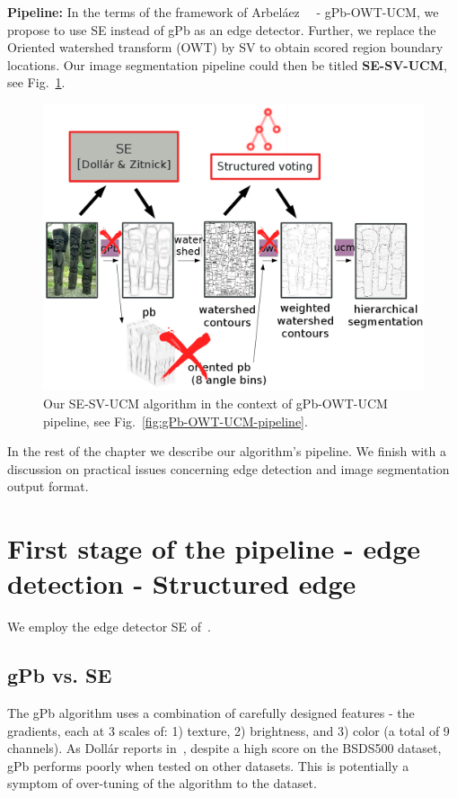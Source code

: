 \textbf{Pipeline:} In the terms of the framework of Arbel\'aez~\etal~\cite{Arbelaez11} - gPb-OWT-UCM, we propose to use SE instead of gPb as an edge detector. Further, we replace the Oriented watershed transform (OWT) by SV to obtain scored region boundary locations. Our image segmentation pipeline could then be titled \textbf{SE-SV-UCM}, see Fig.~\ref{fig:SE-SV-UCM-pipeline}.

\begin{figure}[ht!]
\centering
 \includegraphics[width=1\textwidth]{images/SE-SV-UCM/SE-SV-UCM_pipeline.png}
\caption{Our SE-SV-UCM algorithm in the context of gPb-OWT-UCM pipeline, see Fig.~\protect\ref{fig:gPb-OWT-UCM-pipeline}.}
\label{fig:SE-SV-UCM-pipeline}
\end{figure}

In the rest of the chapter we describe our algorithm's pipeline. We finish with a discussion on practical issues concerning edge detection and image segmentation output format.

\section[First stage of the pipeline - Structured edge]{First stage of the pipeline - edge detection - Structured edge}
We employ the edge detector SE of~\cite{DollarICCV13edges,Dollar2015PAMI}.

\subsection{gPb vs. SE}
The gPb algorithm uses a combination of carefully designed features - the gradients, each at 3 scales of: 1) texture, 2) brightness, and 3) color (a total of 9 channels). As Doll\'ar reports in~\cite{DollarICCV13edges}, despite a high score on the BSDS500 dataset, gPb performs poorly when tested on other datasets. This is potentially a symptom of over-tuning of the algorithm to the dataset.

